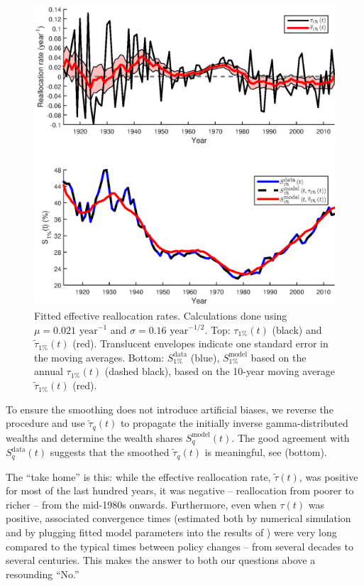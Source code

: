 \begin{figure}[!htb]
\centering
\includegraphics[width=1.0\textwidth] {./chapter_3/figs/tau_top1.eps}
\caption{Fitted effective reallocation rates. Calculations done using $\mu=0.021 \text{ year}^{-1}$ and $\sigma=0.16 \text{ year}^{-1/2}$. Top: $\tau_{1\%}\left(t\right)$ (black) and $\widetilde{\tau}_{1\%}\left(t\right)$ (red). Translucent envelopes indicate one standard error in the moving averages. Bottom: $S^{\text{data}}_{1\%}$ (blue), $S^{\text{model}}_{1\%}$ based on the annual $\tau_{1\%}\left(t\right)$ (dashed black), based on the 10-year moving average $\widetilde{\tau}_{1\%}\left(t\right)$ (red).}
\end{figure}

To ensure the smoothing does not introduce artificial biases, we reverse the procedure and use $\widetilde{\tau}_q\left(t\right)$ to propagate the initially inverse gamma-distributed wealths and determine the wealth shares $S^{\text{model}}_q\left(t\right)$. The good agreement with $S^{\text{data}}_q\left(t\right)$ suggests that the smoothed $\widetilde{\tau}_q\left(t\right)$ is meaningful, see  (bottom).

The ``take home'' is this: while the effective reallocation rate, $\widetilde{\tau}\left(t\right)$, was positive for most of the last hundred years, it was negative -- \ie reallocation from poorer to richer -- from the mid-1980s onwards. Furthermore, even when $\tau\left(t\right)$ was positive, associated convergence times (estimated both by numerical simulation and by plugging fitted model parameters into the results of ) were very long compared to the typical times between policy changes -- from several decades to several centuries. This makes the answer to both our questions above a resounding ``No.''

